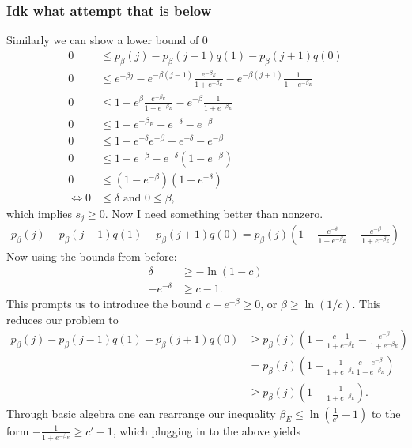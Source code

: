 \documentclass{article}
\newcommand{\parens}[1]{\left( #1 \right)}
\begin{document}
\subsubsection{Idk what attempt that is below}
Similarly we can show a lower bound of 0
\begin{align}
    0 &\leq p_{\beta}(j) - p_{\beta}(j-1) q(1) - p_{\beta}(j+1) q(0) \\
    0 &\leq e^{-\beta j} - e^{-\beta(j - 1)} \frac{e^{-\beta_E}}{1 + e^{-\beta_E}} - e^{-\beta(j+1)} \frac{1}{1 + e^{-\beta_E}} \\
    0 &\leq 1 - e^{\beta} \frac{e^{-\beta_E}}{1 + e^{-\beta_E}} - e^{-\beta} \frac{1}{1 + e^{-\beta_E}} \\
    0&\leq 1 + e^{-\beta_E} -e^{-\delta} - e^{-\beta} \\
    0 &\leq 1 + e^{-\delta} e^{-\beta} - e^{-\delta } - e^{-\beta} \\
    0 &\leq 1 - e^{-\beta} - e^{-\delta} (1 - e^{-\beta}) \\
    0 &\leq (1-e^{-\beta})(1 - e^{-\delta}) \\
    \iff 0 &\leq \delta \text{ and } 0 \leq \beta,
\end{align}
which implies $s_j \ge 0$. Now I need something better than nonzero. 
\begin{align}
    p_{\beta}(j) - p_{\beta}(j-1) q(1) - p_{\beta}(j+1) q(0) = p_{\beta}(j) \left( 1 - \frac{e^{-\delta}}{1 + e^{-\beta_E}} - \frac{e^{-\beta}}{1 + e^{-\beta_E}} \right) 
\end{align}
Now using the bounds from before:
\begin{align}
    \delta &\geq - \ln(1 - c) \\
    - e^{-\delta} &\geq c - 1. 
\end{align}
This prompts us to introduce the bound $c - e^{-\beta} \ge 0$, or $\beta \geq \ln(1/c)$. This reduces our problem to
\begin{align}
    p_{\beta}(j) - p_{\beta}(j-1) q(1) - p_{\beta}(j+1) q(0) &\ge p_{\beta}(j)\parens{1 + \frac{c - 1}{1 + e^{-\beta_E}} - \frac{e^{-\beta}}{1 + e^{-\beta_E}}} \\
    &= p_{\beta}(j)\parens{1 - \frac{1}{1 + e^{-\beta_E}} \frac{c - e^{-\beta}}{1 + e^{-\beta_E}}} \\
    &\ge p_{\beta}(j) \parens{1 - \frac{1}{1 + e^{-\beta_E}}}.
\end{align}
Through basic algebra one can rearrange our inequality $\beta_E \le \ln \left( \frac{1}{c'} - 1\right)$ to the form $-\frac{1}{1 + e^{-\beta_E}} \geq c' - 1$, which plugging in to the above yields
\end{document}
